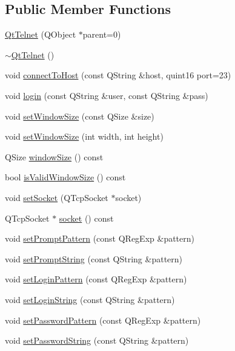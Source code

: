 \subsection*{Public Member Functions}
\begin{DoxyCompactItemize}
\item 
\hyperlink{classQtTelnet_a246f1f976859e2530a4cd2183b2ee2e0}{QtTelnet} (QObject $\ast$parent=0)
\item 
\hyperlink{classQtTelnet_a9fb18d832d8844fcb956a46f0aa4e1a4}{$\sim$QtTelnet} ()
\item 
void \hyperlink{classQtTelnet_a226897664d5b148a31d811acb964cc91}{connectToHost} (const QString \&host, quint16 port=23)
\item 
void \hyperlink{classQtTelnet_a2142cdc1a44a56e3037529dde6f5c9ca}{login} (const QString \&user, const QString \&pass)
\item 
void \hyperlink{classQtTelnet_ac4475a0ca183283d3f9e26f3a4857124}{setWindowSize} (const QSize \&size)
\item 
void \hyperlink{classQtTelnet_a6cdc9b7fc9d27261dd62bf5725bf9e3c}{setWindowSize} (int width, int height)
\item 
QSize \hyperlink{classQtTelnet_a8d6a8c8f7be73d0fd17042eb472b1bb7}{windowSize} () const 
\item 
bool \hyperlink{classQtTelnet_a48d00e9c0481c66833d6aa480d7ba873}{isValidWindowSize} () const 
\item 
void \hyperlink{classQtTelnet_a4d9b0d3d024344f5319cdf5cde1f647a}{setSocket} (QTcpSocket $\ast$socket)
\item 
QTcpSocket $\ast$ \hyperlink{classQtTelnet_a76817174fd5ca030ab5a40a1b5735e79}{socket} () const 
\item 
void \hyperlink{classQtTelnet_a096bcdda2451ccbfea3c4eb4b26fd51e}{setPromptPattern} (const QRegExp \&pattern)
\item 
void \hyperlink{classQtTelnet_a137fcf7ced491719268d07a7b53aff25}{setPromptString} (const QString \&pattern)
\item 
void \hyperlink{classQtTelnet_a2910ce853f6ea8b50d8ab1cfc607f168}{setLoginPattern} (const QRegExp \&pattern)
\item 
void \hyperlink{classQtTelnet_a638099de262c33cd5ffc2e007bce5ebf}{setLoginString} (const QString \&pattern)
\item 
void \hyperlink{classQtTelnet_a13cc290fbfd93c50c5263b3191da8f69}{setPasswordPattern} (const QRegExp \&pattern)
\item 
void \hyperlink{classQtTelnet_a95a9e595ae0f7d95f5e410e2e553bd1d}{setPasswordString} (const QString \&pattern)
\end{DoxyCompactItemize}
